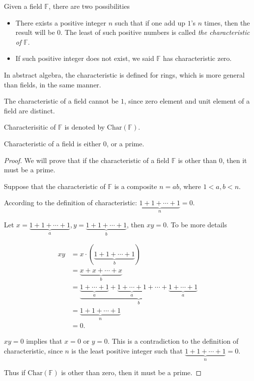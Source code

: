 \begin{definition}
    Given a field $\mathbb{F}$, there are two possibilities
    \begin{itemize}
        \item There exists a positive integer $n$ such that if one add up $1$'s $n$ times, then the result will be $0$. The least of such positive numbers is called \textit{the characteristic of $\mathbb{F}$}.
        \item If such positive integer does not exist, we said $\mathbb{F}$ has characteristic zero.
    \end{itemize}
\end{definition}

\begin{note}
    In abstract algebra, the characteristic is defined for rings, which is more general than fields, in the same manner.

    The characteristic of a field cannot be $1$, since zero element and unit element of a field are distinct.

    Characterisitic of $\mathbb{F}$ is denoted by $\text{Char}(\mathbb{F})$.
\end{note}

\begin{theorem}
    Characteristic of a field is either $0$, or a prime.
\end{theorem}

\begin{proof}
    We will prove that if the characteristic of a field $\mathbb{F}$ is other than $0$, then it must be a prime.

    Suppose that the characteristic of $\mathbb{F}$ is a composite $n = ab$, where $1 < a, b < n$.

    According to the definition of characteristic: $\underbrace{1 + 1 + \cdots + 1}_{n} = 0$.

    Let $x = \underbrace{1 + 1 + \cdots + 1}_{a}, y = \underbrace{1 + 1 + \cdots + 1}_{b}$, then $xy = 0$. To be more details

    \begin{align*}
        xy & = x\cdot (\underbrace{1 + 1 + \cdots + 1}_{b}) \\
           & = \underbrace{x + x + \cdots + x}_{b} \\
           & = \underbrace{\underbrace{1 + \cdots + 1}_{a} + \underbrace{1 + \cdots + 1}_{a} + \cdots + \underbrace{1 + \cdots + 1}_{a}}_{b} \\
           & = \underbrace{1 + 1 + \cdots + 1}_{n} \\
           & = 0.
    \end{align*}

    $xy = 0$ implies that $x = 0$ or $y = 0$. This is a contradiction to the definition of characteristic, since $n$ is the least positive integer such that $\underbrace{1 + 1 + \cdots + 1}_{n} = 0$.

    Thus if $\text{Char}(\mathbb{F})$ is other than zero, then it must be a prime.
\end{proof}

